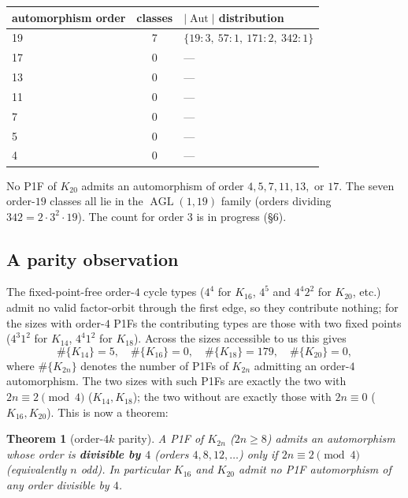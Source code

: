 \documentclass[11pt,reqno]{amsart}
\theoremstyle{plain}
\newtheorem{theorem}{Theorem}
\theoremstyle{definition}
\numberwithin{theorem}{section}
\newcommand{\Aut}{\operatorname{Aut}}
\newcommand{\AGL}{\operatorname{AGL}}
\begin{document}
\begin{center}
\begin{tabular}{lcl}
\toprule
automorphism order & classes & $|\Aut|$ distribution \\
\midrule
19 & 7 & $\{19{:}3,\ 57{:}1,\ 171{:}2,\ 342{:}1\}$ \\
17 & 0 & --- \\
13 & 0 & --- \\
11 & 0 & --- \\
7  & 0 & --- \\
5  & 0 & --- \\
4  & 0 & --- \\
\bottomrule
\end{tabular}
\end{center}

No P1F of $K_{20}$ admits an automorphism of order $4,5,7,11,13,$ or $17$. The seven
order-$19$ classes all lie in the $\AGL(1,19)$ family (orders dividing
$342=2\cdot 3^2\cdot 19$). The count for order $3$ is in progress (\S6).

\subsection{A parity observation}

The fixed-point-free order-$4$ cycle types ($4^4$ for $K_{16}$, $4^5$ and $4^4 2^2$
for $K_{20}$, etc.) admit no valid factor-orbit through the first edge, so they
contribute nothing; for the sizes with order-$4$ P1Fs the contributing types are
those with two fixed points ($4^3 1^2$ for $K_{14}$, $4^4 1^2$ for $K_{18}$). Across
the sizes accessible to us this gives
\[
\#\{K_{14}\}=5,\quad \#\{K_{16}\}=0,\quad \#\{K_{18}\}=179,\quad \#\{K_{20}\}=0,
\]
where $\#\{K_{2n}\}$ denotes the number of P1Fs of $K_{2n}$ admitting an order-$4$
automorphism. The two sizes with such P1Fs are exactly the two with
$2n\equiv 2\pmod 4$ ($K_{14},K_{18}$); the two without are exactly those with
$2n\equiv 0$ ($K_{16},K_{20}$). This is now a theorem:

\begin{theorem}[order-$4k$ parity]
A P1F of $K_{2n}$ ($2n\ge8$) admits an
automorphism whose order is \textbf{divisible by $4$} (orders $4,8,12,\dots$) only if
$2n\equiv 2\pmod 4$ (equivalently $n$ odd). In particular $K_{16}$ and $K_{20}$ admit
no P1F automorphism of any order divisible by $4$.
\end{theorem}
\end{document}
